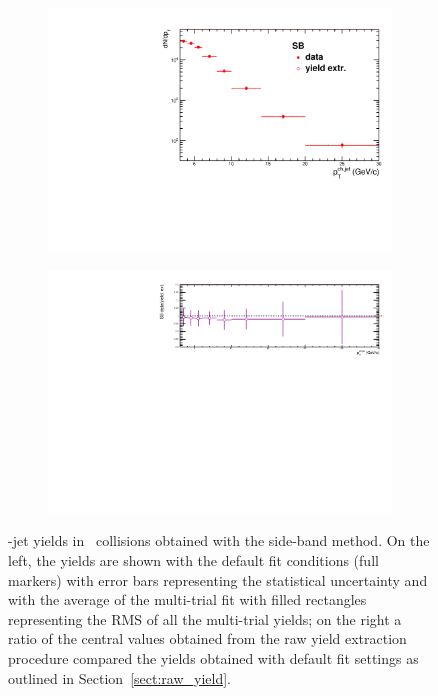\begin{figure}[bth]
\begin{center}
\begin{subfigure}[b]{.45\textwidth}
\includegraphics[width=\textwidth]{pPbplots/yieldExtraction/jetPtComparison_DataMVariation_SB}
\label{fig:AverageRawYieldVsDefault_Yields_pPb}
\end{subfigure}
\begin{subfigure}[b]{.45\textwidth}
\includegraphics[width=\textwidth]{pPbplots/yieldExtraction/SBRatio}
\label{fig:MultiTrialSys_pPb}
\end{subfigure}
\caption{\Dstar-jet yields in \pPb\ collisions obtained  with the side-band method.
On the left, the yields are shown with the default fit conditions (full markers) with error bars representing the statistical uncertainty and with the average of
the multi-trial fit with filled rectangles representing the RMS of all the multi-trial yields; on the right a ratio of the central values obtained from the raw yield extraction procedure compared the yields obtained with default fit settings as outlined in Section~\ref{sect:raw_yield}. } 
\label{fig:AverageRawYieldVsDefault_pPB}
\end{center}
\end{figure}

